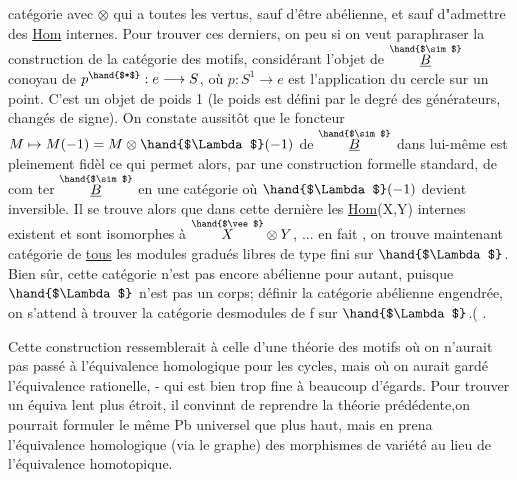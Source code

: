 
catégorie  avec $\otimes$ qui a toutes les vertus, sauf d'être abélienne, et
sauf d"admettre des \uline{Hom} internes. Pour trouver ces derniers, on peu
si on veut paraphraser la construction de la catégorie des motifs,
  considérant l'objet  de $\overset{\hand{$\sim$}}{\underline{B}}$ conoyau de
$p^{\hand{$*$}} : e \longrightarrow S$, où $p:S^1 \longrightarrow e$ est l'application du cercle sur un
point. C'est un objet de poids 1 (le poids est défini par le degré
des générateurs, changés de signe). On constate aussitôt que le
foncteur $M \mapsto M(-1) = M\otimes \hand{$\Lambda$}(-1)$ de $\overset{\hand{$\sim$}}{\underline{B}}$ dans lui-même est pleinement fidèl
ce qui permet alors, par une construction formelle standard, de com
\margin{\unsure{$\ell\varphi$}} ter $\overset{\hand{$\sim$}}{\underline{B}}$ en une catégorie où $\hand{$\Lambda$}(-1)$ devient inversible. Il se trouve
alors que dans cette dernière les \uline{Hom}(X,Y) internes existent et
 sont isomorphes à $\overset{\hand{$\vee$}}{X}\otimes Y$, ... en fait , on trouve maintenant
catégorie de \uline{tous} les modules gradués libres de type fini sur $\hand{$\Lambda$}$.
Bien sûr, cette catégorie n'est pas encore abélienne pour autant,
puisque $\hand{$\Lambda$}$ n'est pas un corps;   définir la catégorie abélienne
engendrée, on s'attend à trouver la catégorie desmodules de   f
\margin{\unsure{$\S$}} sur $\hand{$\Lambda$}$.(  .

Cette construction ressemblerait à celle d'une théorie des
motifs où on n'aurait pas passé à l'équivalence homologique pour
les cycles, mais où on aurait gardé l'équivalence rationelle, - qui
est bien trop fine à beaucoup d'égards. Pour trouver un équiva
lent plus étroit, il convinnt de reprendre la théorie prédédente,on
pourrait formuler le même Pb universel que plus haut, mais en prena
l'équivalence homologique (via le graphe) des morphismes de variété
au lieu de l'équivalence homotopique. 

